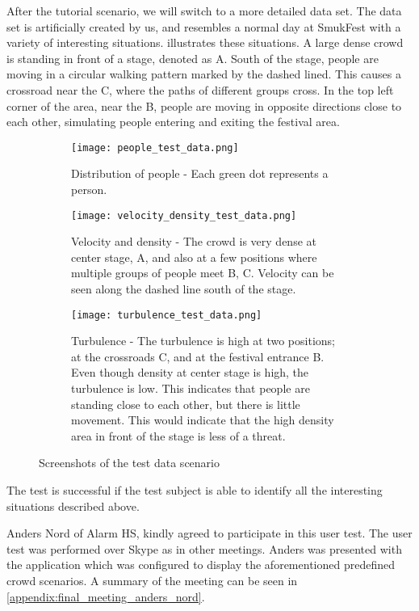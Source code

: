 After the tutorial scenario, we will switch to a more detailed data set. The data set is artificially created by us, and resembles a normal day at SmukFest with a variety of interesting situations.  illustrates these situations. A large dense crowd is standing in front of a stage, denoted as A. South of the stage, people are moving in a circular walking pattern marked by the dashed lined. This causes a crossroad near the C, where the paths of different groups cross. In the top left corner of the area, near the B, people are moving in opposite directions close to each other, simulating people entering and exiting the festival area.

\begin{figure}[htbp]
\begin{subfigure}[t]{.49\linewidth}
    \centering
    \texttt{[image: people\_test\_data.png]}
    \caption{Distribution of people - Each green dot represents a person.}
\end{subfigure}
\enspace
\begin{subfigure}[t]{.49\linewidth}
    \centering
    \texttt{[image: velocity\_density\_test\_data.png]}
    \caption{Velocity and density - The crowd is very dense at center stage, A, and also at a few positions where multiple groups of people meet B, C. Velocity can be seen along the dashed line south of the stage.}
\end{subfigure}
\enspace
\begin{subfigure}[t]{.49\linewidth}
    \centering
    \texttt{[image: turbulence\_test\_data.png]}
    \caption{Turbulence - The turbulence is high at two positions; at the crossroads C, and at the festival entrance B. Even though density at center stage is high, the turbulence is low. This indicates that people are standing close to each other, but there is little movement. This would indicate that the high density area in front of the stage is less of a threat.}
\end{subfigure}
\caption{Screenshots of the test data scenario}
\label{fig:test_data_screens}
\end{figure}

The test is successful if the test subject is able to identify all the interesting situations described above. 

Anders Nord of Alarm HS, kindly agreed to participate in this user test. The user test was performed over Skype as in other meetings. Anders was presented with the application which was configured to display the aforementioned predefined crowd scenarios. A summary of the meeting can be seen in \cref{appendix:final_meeting_anders_nord}.

